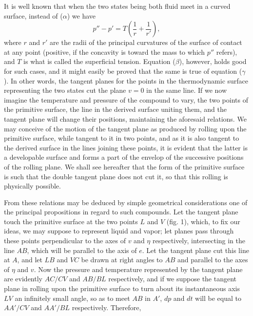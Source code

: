\documentclass[11pt]{article}
\begin{document}
{It is well known that when the two states being both fluid meet in a curved surface, instead of ($\alpha$) we have
\[
p''-p'=T\left(\frac{1}{r}+\frac{1}{r'}\right),
\]
where $r$ and $r'$ are the radii of the principal curvatures of the surface of contact at any point (positive, if the concavity is toward the mass to which $p''$ refers), and $T$ is what is called the superficial tension. Equation ($\beta$), however, holds good for such cases, and it might easily be proved that the same is true of equation ($\gamma$). In other words, the tangent planes for the points in the thermodynamic surface representing the two states cut the plane $v=0$ in the same line.} If we now imagine the temperature and pressure of the compound to vary, the two points of the primitive surface, the line in the derived surface uniting them, and the tangent plane will change their positions, maintaining the aforesaid relations. We may conceive of the motion of the tangent plane as produced by rolling upon the primitive surface, while tangent to it in two points, and as it is also tangent to the derived surface in the lines joining these points, it is evident that the latter is a developable surface and forms a part of the envelop of the successive positions of the rolling plane. We shall see hereafter that the form of the primitive surface is such that the double tangent plane does not cut it, so that this rolling is physically possible.

From these relations may be deduced by simple geometrical considerations one of the principal propositions in regard to such compounds. Let the tangent plane touch the primitive surface at the two points $L$ and $V$ (fig. 1), which, to fix our ideas, we may suppose to represent liquid and vapor; let planes pass through these points perpendicular to the axes of $v$ and $\eta$ respectively, intersecting in the line $AB$, which will be parallel to the axis of $e$. Let the tangent plane cut this line at $A$, and let $LB$ and $VC$ be drawn at right angles to $AB$ and parallel to the axes of $\eta$ and $v$. Now the pressure and temperature represented by the tangent plane are evidently $AC/CV$ and $AB/BL$ respectively, and if we suppose the tangent plane in rolling upon the primitive surface to turn about its instantaneous axis $LV$ an infinitely small angle, so as to meet $AB$ in $A'$, $dp$ and $dt$ will be equal to $AA'/CV$ and $AA'/BL$ respectively. Therefore,

\begin{figure}[h]
\centering
{}
\end{figure}
\end{document}
